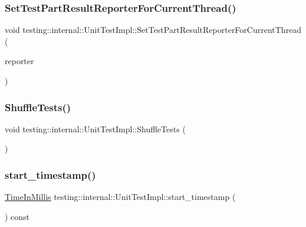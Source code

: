 \subsubsection{\texorpdfstring{Set\+Test\+Part\+Result\+Reporter\+For\+Current\+Thread()}{SetTestPartResultReporterForCurrentThread()}}
{\footnotesize\ttfamily void testing\+::internal\+::\+Unit\+Test\+Impl\+::\+Set\+Test\+Part\+Result\+Reporter\+For\+Current\+Thread (\begin{DoxyParamCaption}\item[{\hyperlink{classtesting_1_1_test_part_result_reporter_interface}{Test\+Part\+Result\+Reporter\+Interface} $\ast$}]{reporter }\end{DoxyParamCaption})}

\mbox{\label{classtesting_1_1internal_1_1_unit_test_impl_aaaa38e6a4372e6bb9bbe3143a3a32b65}} 
\subsubsection{\texorpdfstring{Shuffle\+Tests()}{ShuffleTests()}}
{\footnotesize\ttfamily void testing\+::internal\+::\+Unit\+Test\+Impl\+::\+Shuffle\+Tests (\begin{DoxyParamCaption}{ }\end{DoxyParamCaption})}

\mbox{\label{classtesting_1_1internal_1_1_unit_test_impl_abb02dfd689760c6323acec725d9631d5}} 
\subsubsection{\texorpdfstring{start\+\_\+timestamp()}{start\_timestamp()}}
{\footnotesize\ttfamily \hyperlink{namespacetesting_1_1internal_a66a845df404b38fe85c5e14a069f255a}{Time\+In\+Millis} testing\+::internal\+::\+Unit\+Test\+Impl\+::start\+\_\+timestamp (\begin{DoxyParamCaption}{ }\end{DoxyParamCaption}) const\hspace{0.3cm}{\ttfamily [inline]}}

